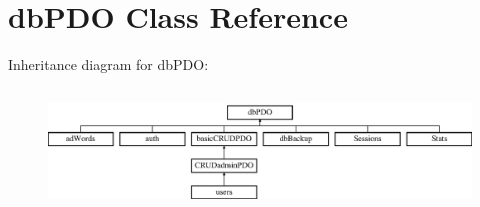 \hypertarget{classdb_p_d_o}{\section{db\-P\-D\-O Class Reference}
\label{classdb_p_d_o}
}
Inheritance diagram for db\-P\-D\-O\-:\begin{figure}[H]
\begin{center}
\leavevmode
\includegraphics[height=3.274854cm]{classdb_p_d_o}
\end{center}
\end{figure}
